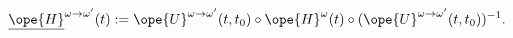 \begin{equation}	\label{12.92new1}
\underline{\ope{H}}^{\omega\to\omega'}(t)
:=
\ope{U}^{\omega\to\omega'}(t,t_0)
\circ\ope{H}^\omega(t) \circ
(\ope{U}^{\omega\to\omega'}(t,t_0))^{-1} .
	\end{equation}

